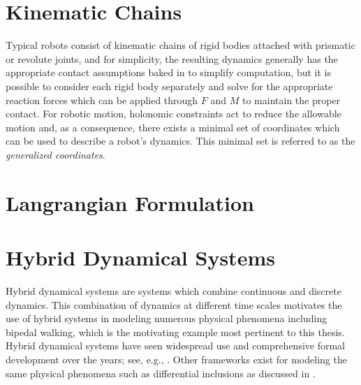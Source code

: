 \section{Kinematic Chains}

Typical robots consist of kinematic chains of rigid bodies attached with prismatic or revolute joints, and for simplicity, the resulting dynamics generally has the appropriate contact assumptions baked in to simplify computation, but it is possible to consider each rigid body separately and solve for the appropriate reaction forces which can be applied through $F$ and $M$ to maintain the proper contact.
%
For robotic motion, holonomic constraints act to reduce the allowable motion and, as a consequence, there exists a minimal set of coordinates which can be used to describe a robot's dynamics.
%
This minimal set is referred to as the {\em generalized coordinates}.


\section{Langrangian Formulation}

%
%

\section{Hybrid Dynamical Systems}

Hybrid dynamical systems are systems which combine continuous and discrete dynamics.
%
This combination of dynamics at different time scales motivates the use of hybrid systems in modeling numerous physical phenomena including bipedal walking, which is the motivating example most pertinent to this thesis.
%
Hybrid dynamical systems have seen widespread use and comprehensive formal development over the years; see, e.g., \cite{aut_2014_gcsa_01,WGCCM07}.
%
Other frameworks exist for modeling the same physical phenomena such as differential inclusions as discussed in \cite{Filippov88}.

